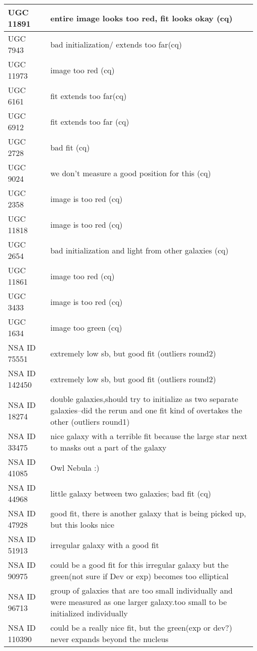 \documentclass[10pt]{article}
\begin{document}
\begin{landscape}
\begin{longtable}{|l|l|}
UGC 11891 & entire image looks too red, fit looks okay (cq)\\ \hline
UGC 7943 & bad initialization/ extends too far(cq)\\ \hline
UGC 11973 & image too red (cq)\\ \hline
UGC 6161 & fit extends too far(cq)\\ \hline
UGC 6912 & fit extends too far (cq)\\ \hline
UGC 2728 & bad fit (cq)\\ \hline
UGC 9024 & we don't measure a good position for this (cq)\\ \hline
UGC 2358 & image is too red (cq)\\ \hline
UGC 11818 & image is too red (cq)\\ \hline
UGC 2654 & bad initialization and light from other galaxies (cq)\\ \hline
UGC 11861 & image too red (cq)\\ \hline
UGC 3433 & image is too red (cq)\\ \hline
UGC 1634 & image too green (cq)\\ \hline
NSA ID 75551 & extremely low sb, but good fit (outliers round2)\\ \hline
NSA ID 142450 & extremely low sb, but good fit (outliers round2)\\ \hline
NSA ID 18274 & double galaxies,should try to initialize as two separate galaxies--did the rerun and one fit kind of overtakes the other (outliers round1)\\ \hline
NSA ID 33475 & nice galaxy with a terrible fit because the large star next to masks out a part of the galaxy\\ \hline
NSA ID 41085 & Owl Nebula :)\\ \hline
NSA ID 44968 & little galaxy between two galaxies; bad fit (cq)\\ \hline
NSA ID 47928 & good fit, there is another galaxy that is being picked up, but this looks nice\\ \hline
NSA ID 51913 & irregular galaxy with a good fit\\ \hline
NSA ID 90975 & could be a good fit for this irregular galaxy but the green(not sure if Dev or exp) becomes too elliptical\\ \hline
NSA ID 96713 & group of galaxies that are too small individually and were measured as one larger galaxy.too small to be initialized individually\\ \hline
NSA ID 110390 & could be a really nice fit, but the green(exp or dev?) never expands beyond the nucleus\\ \hline

\end{longtable}
\end{landscape}
\end{document}
